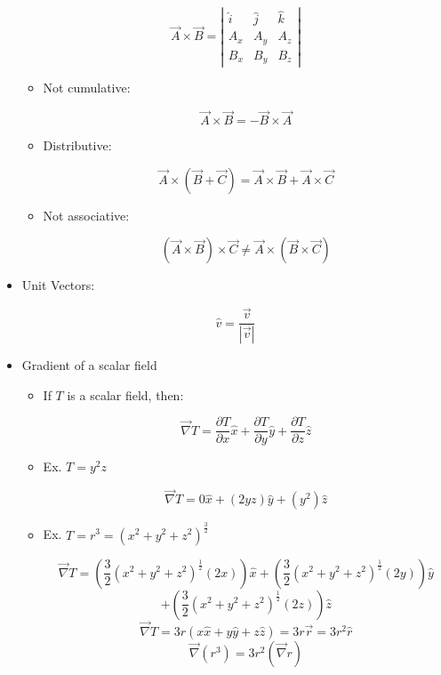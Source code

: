 \begin{itemize}
    $$\vec{A}\times\vec{B}=\left|\begin{matrix}\hat{i} & \hat{j} & \hat{k}\\ A_x & A_y & A_z\\ B_x & B_y & B_z\end{matrix}\right|$$

    \begin{itemize}

      \item Not cumulative:

    $$\vec{A}\times\vec{B}=-\vec{B}\times\vec{A}$$

      \item Distributive:

        $$\vec{A}\times(\vec{B}+\vec{C})=\vec{A}\times\vec{B}+\vec{A}\times\vec{C}$$

      \item Not associative:

        $$(\vec{A}\times\vec{B})\times\vec{C}\neq\vec{A}\times(\vec{B}\times\vec{C})$$

    \end{itemize}

  \item Unit Vectors:

    $$\hat{v}=\frac{\vec{v}}{|\vec{v}|}$$

  \item Gradient of a scalar field

    \begin{itemize}

      \item If $T$ is a scalar field, then:

        $$\vec{\nabla}T=\frac{\partial T}{\partial x}\hat{x}+\frac{\partial T}{\partial y}\hat{y}+\frac{\partial T}{\partial z}\hat{z}$$

      \item Ex. $T=y^2z$

        $$\vec{\nabla}T=0\hat{x}+(2yz)\hat{y}+(y^2)\hat{z}$$

      \item Ex. $T=r^3=(x^2+y^2+z^2)^{\frac{3}{2}}$

        $$\vec{\nabla}T=\left(\frac{3}{2}(x^2+y^2+z^2)^{\frac{1}{2}}(2x)\right)\hat{x}+\left(\frac{3}{2}(x^2+y^2+z^2)^{\frac{1}{2}}(2y)\right)\hat{y}$$
        $$+\left(\frac{3}{2}(x^2+y^2+z^2)^{\frac{1}{2}}(2z)\right)\hat{z}$$
        $$\vec{\nabla}T=3r(x\hat{x}+y\hat{y}+z\hat{z})=3r\vec{r}=3r^2\hat{r}$$
        $$\vec{\nabla}(r^3)=3r^2(\vec{\nabla}r)$$


\end{itemize}
\end{itemize}
